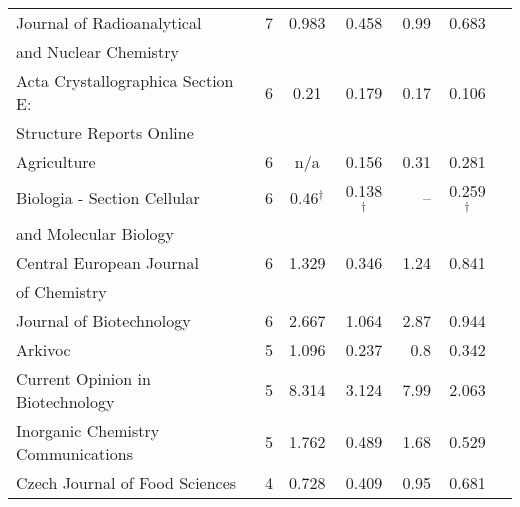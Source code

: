 \begin{longtable}[c]{lcccrcc}
  Journal of Radioanalytical                                                         & 7      & 0.983   & 0.458 &  0.99      & 0.683                 \\[0.5ex]
  and Nuclear Chemistry                                                              &        &         &       &            &                       \\[0.5ex]
  Acta Crystallographica Section E:                                                  & 6      & 0.21    & 0.179 &  0.17      & 0.106                 \\[0.5ex]
  Structure Reports Online                                                           &        &         &       &            &                       \\[0.5ex]
  Agriculture                                                                        & 6      & n/a     & 0.156 &  0.31      & 0.281                 \\[0.5ex]
  Biologia - Section Cellular                                                        & 6      & 0.46$^\dagger$    & 0.138 $^\dagger$ &  --       & 0.259$^\dagger$ \\[0.5ex]
  and Molecular Biology                                                             &        &         &       &            &                \\[0.5ex]
  Central European Journal                                                           & 6      & 1.329   & 0.346 &  1.24      & 0.841                 \\[0.5ex]
  of Chemistry                                                                       &        &         &       &            &                       \\[0.5ex]
  Journal of Biotechnology                                                           & 6      & 2.667   & 1.064 &  2.87      & 0.944                 \\[0.5ex]
  Arkivoc                                                                            & 5      & 1.096   & 0.237 &  0.8       & 0.342                 \\[0.5ex]
  Current Opinion in Biotechnology                                                   & 5      & 8.314   & 3.124 &  7.99      & 2.063                 \\[0.5ex]
  Inorganic Chemistry Communications                                                 & 5      & 1.762   & 0.489 &  1.68      & 0.529                 \\[0.5ex]
  Czech Journal of Food Sciences                                                     & 4      & 0.728   & 0.409 &  0.95      & 0.681                 \\[0.5ex]

\end{longtable}
